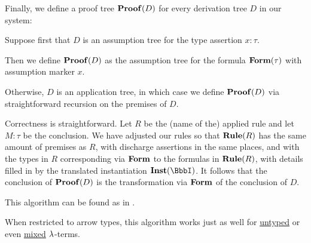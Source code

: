 \begin{algorithm}
\begin{thmenum}
     Finally, we define a proof tree \( \op*{Proof}(D) \) for every derivation tree \( D \) in our system:
    \begin{thmenum}
       Suppose first that \( D \) is an assumption tree for the type assertion \( x: \tau \).

      Then we define \( \op*{Proof}(D) \) as the assumption tree for the formula \( \op*{Form}(\tau) \) with assumption marker \( x \).

       Otherwise, \( D \) is an application tree, in which case we define \( \op*{Proof}(D) \) via straightforward recursion on the premises of \( D \).

      Correctness is straightforward. Let \( R \) be the (name of the) applied rule and let \( M: \tau \) be the conclusion. We have adjusted our rules so that \( \op*{Rule}(R) \) has the same amount of premises as \( R \), with discharge assertions in the same places, and with the types in \( R \) corresponding via \( \op*{Form} \) to the formulas in \( \op*{Rule}(R) \), with details filled in by the translated instantiation \( \op*{Inst}(\BbbI) \). It follows that the conclusion of \( \op*{Proof}(D) \) is the transformation via \( \op*{Form} \) of the conclusion of \( D \).
    \end{thmenum}
  \end{thmenum}
\end{algorithm}
\begin{comments}
  \item This algorithm can be found as  in \cite{notebook:code}.

  \item When restricted to arrow types, this algorithm works just as well for \hyperref[def:lambda_term]{untyped} or even \hyperref[rem:mixed_lambda_term]{mixed} \( {\mathrm \lambda} \)-terms.
\end{comments}

